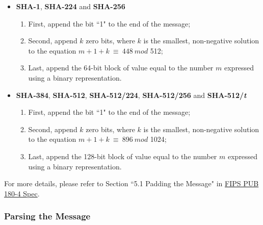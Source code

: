 \documentclass[main\_\_EN.tex]{subfiles}
\begin{document}
\begin{itemize}
    \item \textbf{SHA-1}, \textbf{SHA-224} and \textbf{SHA-256}
        \begin{enumerate}
        \item First, append the bit ``1" to the end of the message;
        \item Second, append \begin{math} k \end{math} zero bits, where \begin{math} k \end{math} is the smallest, non-negative solution to the equation \begin{math}m + 1 + k \ {\equiv} \ 448 \ mod \end{math} 512;
        \item Last, append the 64-bit block of value equal to the number \begin{math} m \end{math} expressed using a binary representation.
        \end{enumerate}
    \item \textbf{SHA-384}, \textbf{SHA-512}, \textbf{SHA-512/224}, \textbf{SHA-512/256} and \textbf{SHA-512/{\it{t}}}
        \begin{enumerate}
        \item First, append the bit ``1" to the end of the message;
        \item Second, append \begin{math} k \end{math} zero bits, where \begin{math} k \end{math} is the smallest, non-negative solution to the equation \begin{math}m + 1 + k \ {\equiv} \ 896 \ mod \end{math} 1024;
        \item Last, append the 128-bit block of value equal to the number \begin{math} m \end{math} expressed using a binary representation.
        \end{enumerate}
\end{itemize}

For more details, please refer to Section ``5.1 Padding the Message" in \href{https://doi.org/10.6028/NIST.FIPS.180-4}{FIPS PUB 180-4 Spec}.

\subsubsection{Parsing the Message}\label{sec:sha-parsing-msg}
\end{document}
